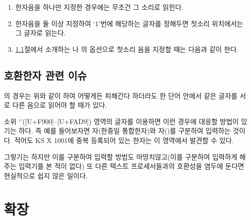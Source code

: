 \documentclass[a4paper,12pt,itemph,footnote]{oblivoir}
\begin{document}
\begin{enumerate}[(1)] \firmlist
\item 한자음을 하나만 지정한 경우에는 무조건 그 소리로 읽힌다.
\begin{myexam}[]
  
\end{myexam}
\item 한자음을 둘 이상 지정하여 `1'번에 해당하는 글자를 정해두면 첫소리 위치에서는 그 글자로 읽는다.
\begin{myexam}[]
  
\end{myexam}
\item \ref{sec:rpread}절에서 소개하는 
나 의 옵션으로 첫소리 음을 지정할 때는 다음과 같이 한다.
\begin{myexam}[]
 
\end{myexam}
\end{enumerate}

\subsection{호환한자 관련 이슈}

의 경우는 위와 같이 하여 어떻게든 피해간다 하더라도
한 단어 안에서 같은 글자를 서로 다른 음으로 읽어야 할 때가 있다.

소위 `'([U+F900]--[U+FAD9]) 영역의 글자를 이용하면
이런 경우에 대응할 방법이 있기는 하다.
즉 예를 들어보자면 자(한중일 통합한자)와
자()를 구분하여 입력하는 것이다.
적어도 KS X 1001에 중복 등록되어 있는 한자는 이 영역에서 발견할 수 있다.
\begin{myexam}[]
\end{myexam}
그렇기는 하지만 이를 구분하여 입력할 방법도 마땅치않고(이를 구분하여 입력하게 해주는 입력기를
본 적이 없다) 또 다른 텍스트 프로세서들과의 호환성을
염두에 둔다면 현실적으로 쉽지 않은 일이다.

\section{확장}

\subsection{\protect{}}\label{sec:rpread}
\end{document}
